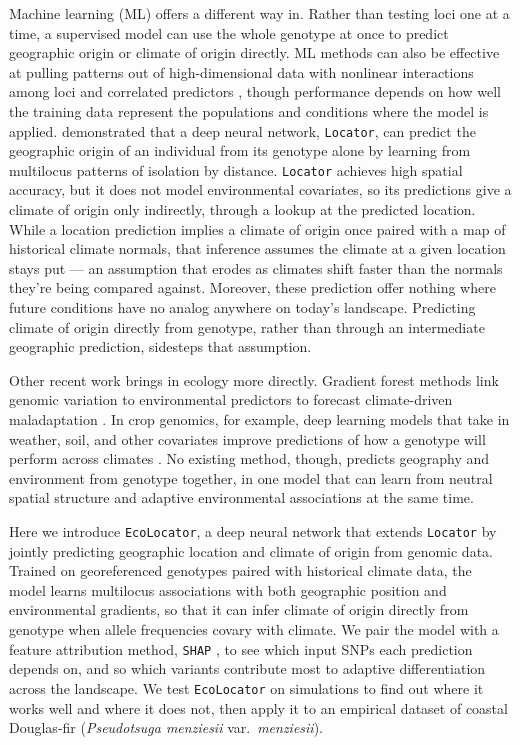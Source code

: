 \documentclass[]{article}
\newcommand{\dfir}{Douglas-fir\xspace}
\newcommand{\ecolocator}{\texttt{EcoLocator}\xspace}
\begin{document}
Machine learning (ML) offers a different way in.
Rather than testing loci one at a time, a supervised model
can use the whole genotype at once to predict
geographic origin or climate of origin directly.
ML methods can also be effective at pulling patterns
out of high-dimensional data with nonlinear interactions among loci
and correlated predictors
\citep{schrider_supervised_2018}, though performance depends 
on how well the training data represent the populations and 
conditions where the model is applied.
\citet{battey_predicting_2020} demonstrated
that a deep neural network, \texttt{Locator}, can predict
the geographic origin of an individual from its genotype alone
by learning from multilocus patterns of isolation by distance.
\texttt{Locator} achieves high spatial accuracy,
but it does not model environmental covariates,
so its predictions give a climate of origin only indirectly, 
through a lookup at the predicted location. While
a location prediction implies a climate of origin once 
paired with a map of historical climate normals, 
that inference assumes the climate at a given location 
stays put — an assumption that erodes as climates shift 
faster than the normals they're being compared against.
Moreover, these prediction offer nothing where future conditions 
have no analog anywhere on today's landscape. 
Predicting climate of origin directly from genotype, 
rather than through an intermediate geographic prediction, 
sidesteps that assumption.

Other recent work brings in ecology more directly.
Gradient forest methods link genomic variation
to environmental predictors to forecast
climate-driven maladaptation \citep{fitzpatrick_experimental_2021}. %
In crop genomics, for example, deep learning models that take in weather, soil,
and other covariates improve predictions of how a genotype will perform
across climates
\citep{washburn_predicting_2021, montesinoslopez_review_2021}.
No existing method, though, predicts geography and environment
from genotype together, in one model that can learn from
neutral spatial structure and adaptive environmental associations at the same time.

Here we introduce \ecolocator,
a deep neural network that extends \texttt{Locator}
by jointly predicting geographic location and climate of origin from genomic data.
Trained on georeferenced genotypes paired
with historical climate data,
the model learns multilocus associations
with both geographic position and environmental gradients,
so that it can infer climate of origin directly from genotype
when allele frequencies covary with climate.
We pair the model with a feature attribution method,
\texttt{SHAP} \citep{lundberg_shap_2017}, %
to see which input SNPs each prediction depends on,
and so which variants contribute most
to adaptive differentiation across the landscape.
We test \ecolocator on simulations to find out
where it works well and where it does not,
then apply it to an empirical dataset of coastal \dfir
(\textit{Pseudotsuga menziesii} var.\ \textit{menziesii}).
\end{document}
